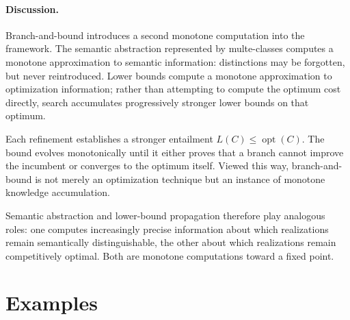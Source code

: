 \documentclass[sigconf,nonacm]{acmart}
\theoremstyle{definition}
\theoremstyle{plain}
\theoremstyle{remark}
\begin{document}
\paragraph{Discussion.}

Branch-and-bound introduces a second monotone computation into the
framework.  The semantic abstraction represented by multe-classes
computes a monotone approximation to semantic information: distinctions
may be forgotten, but never reintroduced.  Lower bounds compute a
monotone approximation to optimization information; rather than
attempting to compute the optimum cost directly, search accumulates
progressively stronger lower bounds on that optimum.

Each refinement establishes a stronger entailment
\(L(C)\le \operatorname{opt}(C)\).
The bound evolves monotonically until it either proves that a branch
cannot improve the incumbent or converges to the optimum itself.
Viewed this way, branch-and-bound is not merely an optimization
technique but an instance of monotone knowledge accumulation.

Semantic abstraction and lower-bound propagation therefore play
analogous roles: one computes increasingly precise information about
which realizations remain semantically distinguishable, the other about
which realizations remain competitively optimal.  Both are monotone
computations toward a fixed point.
%
%
%
%
%
%
%
%
%
%
%
%


\section{Examples}
\label{sec:examples}
\end{document}
